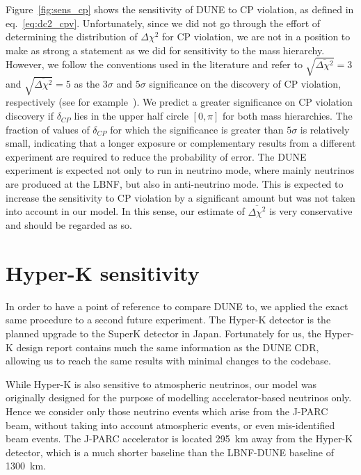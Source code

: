 Figure~\ref{fig:sens_cp} shows the sensitivity of DUNE to CP violation, as
defined in eq.~\ref{eq:dc2_cpv}. Unfortunately, since we did not go through the effort of
determining the distribution of $\Delta\chi^2$ for CP violation, we are not in
a position to make as strong a statement as we did for sensitivity to the mass hierarchy.
However, we follow the conventions used in the literature and refer to
$\sqrt{\overline{\Delta\chi^2}}=3$ and $\sqrt{\overline{\Delta\chi^2}}=5$ as
the $3\sigma$ and $5\sigma$ significance on the discovery of CP violation,
respectively (see
for example~\cite{ballett, martin-albo, laguna-lbno, masud}). We predict a greater
significance on CP violation discovery if $\delta_{CP}$ lies in the upper half circle
$[0, \pi]$ for both mass hierarchies. The fraction of values of $\delta_{CP}$
for which the significance is greater than $5\sigma$ is relatively small,
indicating that a longer exposure or complementary results from a different
experiment are required to reduce the probability of error.
The DUNE experiment is expected not only to run in neutrino mode, where mainly
neutrinos are produced at the LBNF, but also in anti-neutrino mode. This
is expected to increase the sensitivity to CP violation by a significant amount
but was not taken into account in our model. In this sense, our estimate of
$\overline{\Delta\chi^2}$ is very conservative and should be regarded as so.


\section{Hyper-K sensitivity}\label{sec:hyperk}
In order to have a point of reference to compare DUNE to, we applied the
exact same procedure to a second future experiment. The Hyper-K detector
is the planned upgrade to the SuperK detector in Japan. Fortunately for us, the
Hyper-K design report\cite{hyperk} contains much the same information as the
DUNE CDR, allowing us to reach the same results with minimal changes to
the codebase. 

While Hyper-K is also sensitive to atmospheric neutrinos, our
model was originally designed for the purpose of modelling accelerator-based
neutrinos only. Hence we consider only those neutrino events which arise from the
J-PARC beam, without taking into account atmospheric events, or even
mis-identified beam events. The J-PARC accelerator is located \SI{295}{\km}
away from the Hyper-K detector, which is a much shorter baseline than the
LBNF-DUNE baseline of \SI{1300}{\km}.

